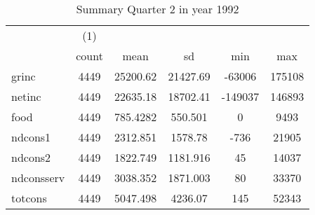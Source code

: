 \begin{table}[htbp]\centering
\def\sym#1{\ifmmode^{#1}\else\(^{#1}\)\fi}
\caption{Summary Quarter 2 in year 1992 \label{sum\_Q2\_y1992}}
\begin{tabular}{l*{1}{ccccc}}
\hline\hline
            &\multicolumn{1}{c}{(1)}&            &            &            &            \\
            &       count&        mean&          sd&         min&         max\\
\hline
grinc       &        4449&    25200.62&    21427.69&      -63006&      175108\\
netinc      &        4449&    22635.18&    18702.41&     -149037&      146893\\
food        &        4449&    785.4282&     550.501&           0&        9493\\
ndcons1     &        4449&    2312.851&     1578.78&        -736&       21905\\
ndcons2     &        4449&    1822.749&    1181.916&          45&       14037\\
ndconsserv  &        4449&    3038.352&    1871.003&          80&       33370\\
totcons     &        4449&    5047.498&     4236.07&         145&       52343\\
\hline\hline
\end{tabular}
\end{table}
